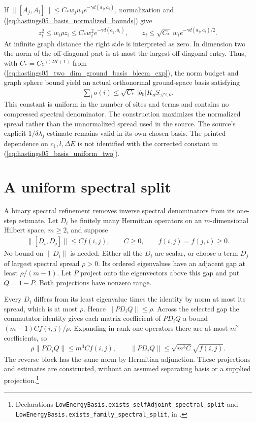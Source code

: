 \documentclass{article}
\providecommand{\leanid}[1]{\nolinkurl{#1}}
\begin{document}
If $\|[A_j,A_i]\|\le C_*w_jw_i e^{-\gamma d(a_j,a_i)}$, normalization and
(\ref{eq:hastings05_basis_normalized_bounds}) give
\begin{align}
 z_i^2\le w_i\rho z_i\le C_*w_i^2e^{-\gamma d(a_j,a_i)},
 \qquad z_i\le\sqrt{C_*}\,w_i e^{-\gamma d(a_j,a_i)/2}.
 \label{eq:hastings05_basis_half_decay}
\end{align}
At infinite graph distance the right side is interpreted as zero. In dimension
two the norm of the off-diagonal part is at most the largest off-diagonal entry.
Thus, with $C_*=Ce^{\gamma(2R+1)}$ from
(\ref{eq:hastings05_two_dim_ground_basis_blecm_exp}), the norm budget and graph
sphere bound yield an actual orthonormal ground-space basis satisfying
\begin{align}
 \sum_i o(i)\le\sqrt{C_*}\,|b_0|K_g S_{\gamma/2,k}.
 \label{eq:hastings05_basis_uniform_two}
\end{align}
This constant is uniform in the number of sites and terms and contains no
compressed spectral denominator. The construction maximizes the normalized
spread rather than the unnormalized spread used in the source. The source's
explicit $1/\delta\lambda_j$ estimate remains valid in its own chosen basis.
The printed dependence on $c_1,l,\Delta E$ is not identified with the corrected
constant in (\ref{eq:hastings05_basis_uniform_two}).

\section{A uniform spectral split}

A binary spectral refinement removes inverse spectral denominators from its
one-step estimate. Let $D_i$ be finitely many Hermitian operators on an
$m$-dimensional Hilbert space, $m\ge2$, and suppose
\begin{align}
 \|[D_i,D_j]\|\le C f(i,j),\qquad C\ge0,\qquad f(i,j)=f(j,i)\ge0.
 \label{eq:hastings05_basis_split_commutators}
\end{align}
No bound on $\|D_i\|$ is needed. Either all the $D_i$ are scalar, or choose a
term $D_j$ of largest spectral spread $\rho>0$. Its ordered eigenvalues have
an adjacent gap at least $\rho/(m-1)$. Let $P$ project onto the eigenvectors
above this gap and put $Q=1-P$. Both projections have nonzero range.

Every $D_i$ differs from its least eigenvalue times the identity by norm at
most its spread, which is at most $\rho$. Hence $\|PD_iQ\|\le\rho$.
Across the selected gap the commutator identity gives each matrix coefficient
of $PD_iQ$ a bound $(m-1)C f(i,j)/\rho$. Expanding in rank-one operators
there are at most $m^2$ coefficients, so
\begin{align}
 \rho\|PD_iQ\|\le m^3 C f(i,j),\qquad
 \|PD_iQ\|\le\sqrt{m^3 C}\sqrt{f(i,j)}.
 \label{eq:hastings05_basis_split_cross}
\end{align}
The reverse block has the same norm by Hermitian adjunction. These
projections and estimates are constructed, without an assumed separating
basis or a supplied projection.\footnote{Declarations
\leanid{LowEnergyBasis.exists_selfAdjoint_spectral_split} and
\leanid{LowEnergyBasis.exists_family_spectral_split}, in
.}
\end{document}
